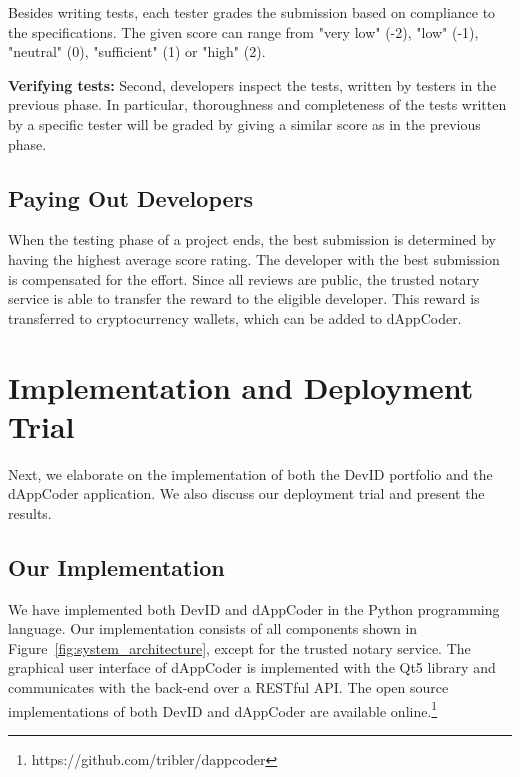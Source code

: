 Besides writing tests, each tester grades the submission based on compliance to the specifications.
The given score can range from "very low" (-2), "low" (-1), "neutral" (0), "sufficient" (1) or "high" (2).

\textbf{Verifying tests:}
Second, developers inspect the tests, written by testers in the previous phase.
In particular, thoroughness and completeness of the tests written by a specific tester will be graded by giving a similar score as in the previous phase.

\subsection{Paying Out Developers}
\label{subsec:dappcoder_payout}
When the testing phase of a project ends, the best submission is determined by having the highest average score rating.
The developer with the best submission is compensated for the effort.
Since all reviews are public, the trusted notary service is able to transfer the reward to the eligible developer.
This reward is transferred to cryptocurrency wallets, which can be added to dAppCoder.

\section{Implementation and Deployment Trial}
\label{sec:experiments}
Next, we elaborate on the implementation of both the DevID portfolio and the dAppCoder application.
We also discuss our deployment trial and present the results.

\subsection{Our Implementation}
We have implemented both DevID and dAppCoder in the Python programming language.
Our implementation consists of all components shown in Figure~\ref{fig:system_architecture}, except for the trusted notary service.
The graphical user interface of dAppCoder is implemented with the Qt5 library and communicates with the back-end over a RESTful API.
The open source implementations of both DevID and dAppCoder are available online.\footnote{https://github.com/tribler/dappcoder}

